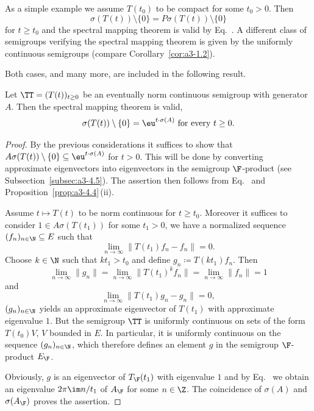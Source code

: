 As a simple example we assume $T(t_{0})$ to be compact for some $t_{0} > 0$.
Then %
\[
	\sigma(T(t)) \setminus \{0\} = P\sigma(T(t)) \setminus \{0\}
\]
%
for $t \geq t_{0}$ and the spectral mapping theorem is valid by Eq.~.
A different class of semigroups verifying the spectral mapping theorem is given by the uniformly continuous semigroups (compare Corollary~\ref{cor:a3-1.2}).

Both cases, and many more, are included in the following result.
\begin{theorem}\label{thm:a3-6.6}%
Let $\TT = (T(t))_{t\geq 0}$ be an eventually norm continuous semigroup with generator $A$.
Then the spectral mapping theorem is valid, \ie 
\begin{equation}\label{eq:a3-6.6)}
	\sigma(T(t)) \setminus \{0\} = \eu^{t \cdot \sigma(A)} \text{ for every } t \geq 0 .
\end{equation}
\end{theorem}
\begin{proof}
By the previous considerations it suffices to show that $A\sigma(T(t)) \setminus \{0\} \subseteq \eu^{t \cdot \sigma(A)}$ for $t > 0$.
This will be done by converting approximate eigenvectors into eigenvectors in the semigroup $\F$-product (see Subsection~\ref{subsec:a3-4.5}).
The assertion then follows from Eq.~ and Proposition~\ref{prop:a3-4.4}\,(ii).

Assume $t \mapsto T(t)$ to be norm continuous for $t \geq t_{0}$.
Moreover it suffices to consider $1 \in A\sigma(T(t_{1}))$ for some $t_{1} > 0$, \ie we have a normalized sequence $(f_{n})_{n\in\N} \subseteq E$ such that
\[
\lim_{n\to\infty} \|T(t_{1})f_{n} - f_{n}\| = 0 .
\]
Choose $k \in \N$ such that $kt_{1} > t_{0}$ and define $g_{n} \coloneq T(kt_{1})f_{n}$.
Then
\[
\lim_{n\to\infty}\|g_{n}\| = \lim_{n\to\infty}\|T(t_{1})^{k}f_{n}\| = \lim_{n\to\infty}\|f_{n}\| = 1
\]
and
\[
\lim_{n\to\infty} \|T(t_{1})g_{n} - g_{n}\| = 0 ,
\]
\ie $(g_{n})_{n\in\N}$ yields an approximate eigenvector 
of\/ $T(t_{1})$ with approximate eigenvalue $1$.
But the semigroup $\TT$ is uniformly continuous on sets of the form $T(t_{0})V$, $V$ bounded in $E$.
In particular, it is uniformly continuous on the sequence $(g_{n})_{n\in\N}$, which therefore defines an element $g$ in the semigroup $\F$-product $E_{\F}$.

Obviously, $g$ is an eigenvector of\/ $T_{\F}(t_{1})$ with eigenvalue $1$ and by Eq.~ we obtain an eigenvalue $2\pi\im  n/t_{1}$ of\/ $A_{\F}$ for some $n \in \Z$.
The coincidence of\/ $\sigma(A)$ and $\sigma(A_{\F})$ proves the assertion.
\end{proof}
